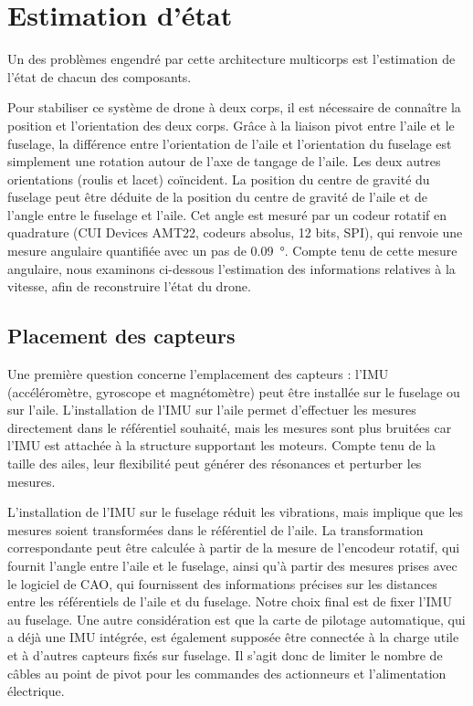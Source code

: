 \section{Estimation d'état}\label{sec:stateEst}

{\color{blue}
    Un des problèmes engendré par cette architecture multicorps est l'estimation de l'état de chacun des composants.
}


Pour stabiliser ce système de drone à deux corps, il est nécessaire de connaître la position et l'orientation des deux corps. Grâce à la liaison pivot entre l'aile et le fuselage, la différence entre l'orientation de l'aile et l'orientation du fuselage est simplement une rotation autour de l'axe de tangage de l'aile. Les deux autres orientations (roulis et lacet) coïncident. La position du centre de gravité du fuselage peut être déduite de la position du centre de gravité de l'aile et de l'angle entre le fuselage et l'aile. Cet angle est mesuré par un codeur rotatif en quadrature (CUI Devices AMT22, codeurs absolus, 12 bits, SPI), qui renvoie une mesure angulaire quantifiée avec un pas de \SI{0,09}{\degree}. Compte tenu de cette mesure angulaire, nous examinons ci-dessous l'estimation des informations relatives à la vitesse, afin de reconstruire l'état du drone.

\subsection{Placement des capteurs}
\label{subsec:sens_pos}
Une première question concerne l'emplacement des capteurs : l'IMU (accéléromètre, gyroscope et magnétomètre) peut être installée sur le fuselage ou sur l'aile. 
L'installation de l'IMU sur l'aile permet d'effectuer les mesures directement dans le référentiel souhaité, mais les mesures sont plus bruitées car l'IMU est attachée à la structure supportant les moteurs. Compte tenu de la taille des ailes, leur flexibilité peut générer des résonances et perturber les mesures. 

L'installation de l'IMU sur le fuselage réduit les vibrations, mais implique que les mesures soient transformées dans le référentiel de l'aile. La transformation correspondante peut être calculée à partir de la mesure de l'encodeur rotatif, qui fournit l'angle entre l'aile et le fuselage, ainsi qu'à partir des mesures prises avec le logiciel de CAO, qui fournissent des informations précises sur les distances entre les référentiels de l'aile et du fuselage. Notre choix final est de fixer l'IMU au fuselage. Une autre considération est que la carte de pilotage automatique, qui a déjà une IMU intégrée, est également supposée être connectée à la charge utile et à d'autres capteurs fixés sur fuselage. Il s'agit donc de limiter le nombre de câbles au point de pivot pour les commandes des actionneurs et l'alimentation électrique.

